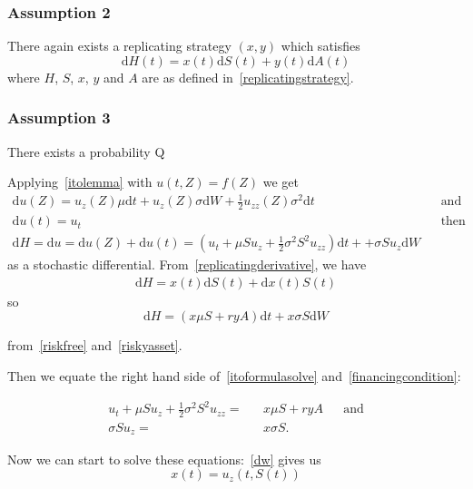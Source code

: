 \documentclass[11pt]{article} %
\begin{document}
\subsubsection{Assumption 2}
There again exists a replicating strategy $(x,y)$ which satisfies 
\begin{equation}\label{replicatingderivative}
    \mathrm{d} H(t) = x(t)\mathrm{d} S(t) + y(t)\mathrm{d} A(t)
\end{equation}
where $H$, $S$, $x$, $y$ and $A$ are as defined in~\eqref{replicatingstrategy}.
\subsubsection{Assumption 3}
There exists a probability Q


Applying~\eqref{itolemma} with $u(t,Z) = f(Z)$ we get   
\begin{align}\label{itoformulasolve}
    \mathrm{d}u(Z)  = u_z(Z)\mu \mathrm{d}t + u_z(Z)\sigma \mathrm{d}W + \frac{1}{2}
    u_{zz}(Z) \sigma^2 \mathrm{d}t&& \text{and} \\
    \mathrm{d}u(t) = u_t &&\text{then} \\
    \mathrm{d}H =\mathrm{d}u = \mathrm{d}u(Z) +\mathrm{d}u(t) =   (u_t + \mu S u_z + \frac{1}{2} 
    \sigma^2 S^2 u_{zz})\mathrm{d}t + +\sigma S u_z \mathrm{d}W
\end{align}
as a stochastic differential.
From~\eqref{replicatingderivative}, we have
\begin{align}
    \mathrm{d}H = x(t)\mathrm{d}S(t) +\mathrm{d}x(t)S(t) 
\end{align}
so
\begin{equation}\label{financingcondition}
    \mathrm{d}H = (x\mu S + ryA)\mathrm{d}t + x \sigma S \mathrm{d}W 
\end{equation}

from~\eqref{riskfree} and~\eqref{riskyasset}.

Then we equate the right hand side of~\eqref{itoformulasolve} and~\eqref{financingcondition}:

\begin{align}\label{dt}
    u_t + \mu S u_z + \frac{1}{2} \sigma^2 S^2 u_{zz}  = &&x\mu S + ryA &&\text{and} \\
    \sigma Su_z =&& x\sigma S.\label{dw}
\end{align}

Now we can start to solve these equations:~\eqref{dw} gives us
\begin{equation}
    x(t) = u_z(t,S(t))
\end{equation}
\end{document}
